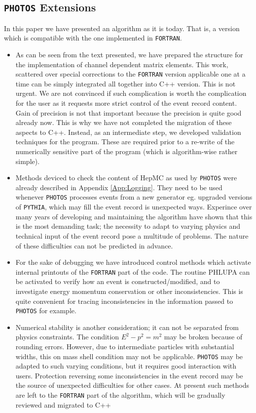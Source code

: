 \documentclass[]{Photos_interface_design}
\begin{document}
\subsection{{\tt PHOTOS} Extensions}
In this paper we have presented an algorithm as it is today. 
That is, a version which is compatible with the one implemented in {\tt FORTRAN}.

\begin{itemize}
\item
As can be seen from the text presented, we have prepared the structure 
for the implementation of channel dependent matrix elements. This work, scattered
 over special corrections to the {\tt FORTRAN} version applicable one at a time can  
be simply integrated all together into C++ version. This is not urgent.
 We are  not convinced if such complication is worth 
the complication for the user as it requests more strict control of the event 
record content. Gain of precision is 
not that important because the precision is quite good already now. 
This is why we have not completed the migration of these aspects to C++.
Instead, as an intermediate step, we developed validation techniques
for the program. These are required prior to a re-write of the
numerically sensitive part of the program (which is algorithm-wise
rather simple).

\item
Methods deviced to check the content of HepMC as used by {\tt PHOTOS} were already 
described in Appendix \ref{App:Logging}. 
They need to be used whenever {\tt PHOTOS} 
processes events from a new generator eg. upgraded versions of  {\tt PYTHIA},
which may fill the event record is unexpected ways.
Experince over many years of developing and maintaining the algorithm
have shown that this is the most demanding task; the necessity to
adapt to varying physics and technical input of the event record pose
a multitude of problems. The nature of these difficulties can not be
predicted in advance. 

\item
For the sake of debugging we have introduced control methods which activate
internal printouts of the {\tt FORTRAN} part of the code.
The routine PHLUPA \cite{Barberio:1993qi} can be activated  to verify 
how an event is constructed/modified, and to investigate energy 
momentum conservation or other inconsistencies.
This is quite convenient for tracing inconsistencies in the
information passed to {\tt PHOTOS} for example.


\item
Numerical stability is another consideration; it can not be separated from
physics constraints. The condition  $E^2-p^2=m^2$ may be broken  because of 
rounding errors.  However, due to intermediate particles with
  substantial widths, this on mass shell condition may not be applicable.
{\tt PHOTOS} may be adapted to such varying conditions, but it requires
good interaction with users. Protection reversing some 
inconsistencies in the event record may be the source of unexpected difficulties
for other cases. 
At present such methods are left to the {\tt FORTRAN} part of the algorithm, 
which
will be gradually reviewed and  migrated to C++
\end{itemize}
\end{document}
